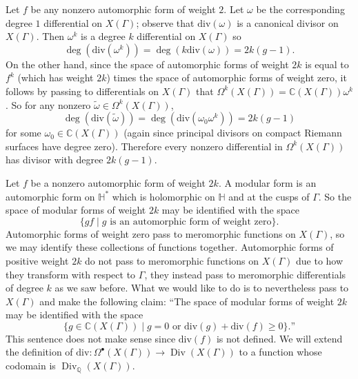 \documentclass[11pt,leqno]{article}
\theoremstyle{plain}
\theoremstyle{definition}
\numberwithin{equation}{section}
\numberwithin{lem}{section}
\DeclareMathOperator{\Div}{Div}
\renewcommand{\div}{\text{div}}
\begin{document}
Let $f$ be any nonzero automorphic form of weight $2$. Let $\omega$ be the corresponding degree $1$ differential on $X(\Gamma)$; observe that $\div(\omega)$ is a canonical divisor on $X(\Gamma)$. Then $\omega^k$ is a degree $k$ differential on $X(\Gamma)$ so 
\[\deg(\div(\omega^k)) = \deg(k\div(\omega)) = 2k(g-1).\]
On the other hand, since the space of automorphic forms of weight $2k$ is equal to $f^k$ (which has weight $2k$) times the space of automorphic forms of weight zero, it follows by passing to differentials on $X(\Gamma)$ that $\Omega^k(X(\Gamma)) = \mathbb C(X(\Gamma))\omega^k$. So for any nonzero $\tilde\omega\in \Omega^k(X(\Gamma))$,
\[\deg(\div(\tilde \omega)) = \deg(\div(\omega_0\omega^k)) = 2k(g-1)\]
for some $\omega_0\in\mathbb C(X(\Gamma))$ (again since principal divisors on compact Riemann surfaces have degree zero). Therefore every nonzero differential in $\Omega^k(X(\Gamma))$ has divisor with degree $2k(g-1)$.

Let $f$ be a nonzero automorphic form of weight $2k$. A modular form is an automorphic form on $\mathbb H^\ast$ which is holomorphic on $\mathbb H$ and at the cusps of $\Gamma$. So the space of modular forms of weight $2k$ may be identified with the space 
\[\{gf\mid g\text{ is an automorphic form of weight zero}\}.\] Automorphic forms of weight zero pass to meromorphic functions on $X(\Gamma)$, so we may identify these collections of functions together. Automorphic forms of positive weight $2k$ do not pass to meromorphic functions on $X(\Gamma)$ due to how they transform with respect to $\Gamma$, they instead pass to meromorphic differentials of degree $k$ as we saw before. What we would like to do is to nevertheless pass to $X(\Gamma)$ and make the following claim: ``The space of modular forms of weight $2k$ may be identified with the space
\[\{g\in \mathbb C(X(\Gamma))\mid g = 0 \text{ or }\div(g)+\div(f)\geq 0\}.\text{''}\]
This sentence does not make sense since $\div(f)$ is not defined. We will extend the definition of $\div\colon \Omega^\bullet(X(\Gamma))\to \Div(X(\Gamma))$ to a function whose codomain is $\Div_{\mathbb Q}(X(\Gamma))$.
\end{document}
